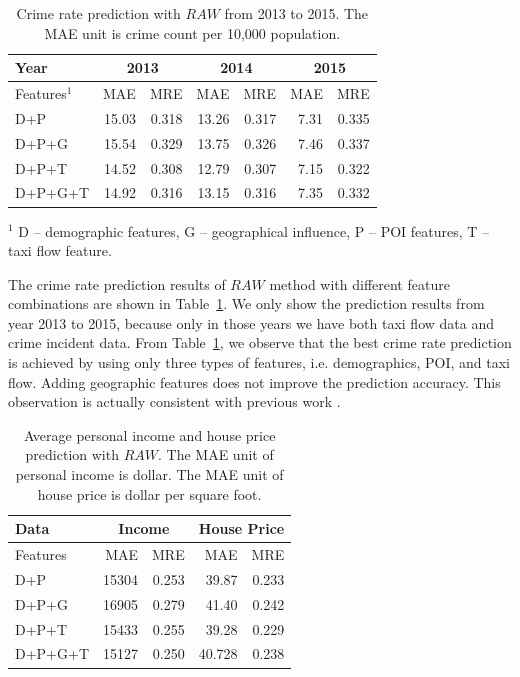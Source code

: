 \begin{table}[h]
\centering
\caption{Crime rate prediction with $RAW$ from 2013 to 2015. The MAE unit is crime count per 10,000 population.}
\label{exp:crime}
\begin{tabular}{|l|r|r|r|r|r|r|}
\hline
Year & \multicolumn{2}{c|}{2013} & \multicolumn{2}{c|}{2014} &  \multicolumn{2}{c|}{2015} \\ \hline
Features$^1$ & MAE & MRE & MAE & MRE & MAE & MRE \\ \hline
D+P	& 15.03	& 0.318	& 13.26 & 0.317	& 7.31	& 0.335 \\ \hline
D+P+G &	15.54	& 0.329	& 13.75	& 0.326	 & 7.46	& 0.337\\ \hline
\rowcolor{Gray}
D+P+T &	14.52	&0.308	&12.79	&0.307	&7.15	&0.322 \\ \hline
D+P+G+T &	14.92	&0.316	&13.15	&0.316	&7.35	&0.332\\ \hline
\end{tabular}

\footnotesize{$^1$ D -- demographic features, G -- geographical influence, P -- POI features, T -- taxi flow feature.\\}
\end{table}

The crime rate prediction results of $RAW$ method with different feature combinations are shown in Table~\ref{exp:crime}. We only show the prediction results from year 2013 to 2015, because only in those years we have both taxi flow data and crime incident data. From Table~\ref{exp:crime}, we observe that the best crime rate prediction is achieved by using only three types of features, i.e. demographics, POI, and taxi flow. Adding geographic features does not improve the prediction accuracy. This observation is actually consistent with previous work \cite{wang2016crime}. 


\begin{table}[h]
\centering
\caption{Average personal income and house price prediction with $RAW$. The MAE unit of personal income is dollar. The MAE unit of house price is dollar per square foot.}
\label{exp:other}
\begin{tabular}{|l|r|r|r|r|}
\hline
Data & \multicolumn{2}{c|}{Income} & \multicolumn{2}{c|}{House Price}  \\ \hline
Features & MAE & MRE & MAE & MRE  \\ \hline
D+P	& 15304 &	0.253 & 39.87 & 0.233 \\ \hline
D+P+G &	16905 &	0.279 & 41.40 & 0.242 \\ \hline
D+P+T &	15433 &	0.255 & \cellcolor{Gray} 39.28 & \cellcolor{Gray} 0.229  \\ \hline
D+P+G+T & \cellcolor{Gray}	15127 & \cellcolor{Gray} 0.250 & 40.728 & 0.238 \\ \hline
\end{tabular}
\end{table}



